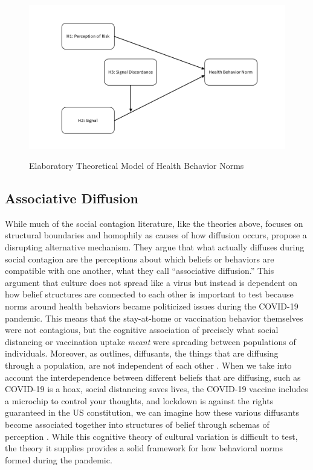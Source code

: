 \begin{figure}
{\centering \includegraphics[width=0.8\linewidth]{figs/paper3/dag}}
\caption{Elaboratory Theoretical Model of Health Behavior Norms}\label{fig:dag}
\end{figure}

\hypertarget{associative-diffusion}{%
\subsection{Associative Diffusion}\label{associative-diffusion}}

While much of the social contagion literature, like the theories above, focuses
on structural boundaries and homophily as causes of how diffusion occurs,
\citet{goldbergSocialContagionAssociative2018} propose a
disrupting alternative mechanism. They argue that what actually diffuses during
social contagion are the perceptions about which beliefs or behaviors are
compatible with one another, what they call ``associative diffusion.'' This
argument that culture does not spread like a virus but instead is dependent on
how belief structures are connected to each other is important to test because
norms around health behaviors became politicized issues during the COVID-19
pandemic. This means that the stay-at-home or vaccination behavior themselves
were not contagious, but the cognitive association of precisely what social
distancing or vaccination uptake \emph{meant} were spreading between populations of
individuals. Moreover, as \citet{houghton20} outlines, diffusants, the things that are
diffusing through a population, are not independent of each other \citep{mason_etal07}. 
When we take into account the interdependence between different beliefs that are 
diffusing, such as COVID-19 is a hoax, social distancing saves
lives, the COVID-19 vaccine includes a microchip to control your thoughts, and lockdown
is against the rights guaranteed in the US constitution, we can imagine how
these various diffusants become associated together into structures of belief
through schemas of perception \citep{houghton20}. While this cognitive theory of
cultural variation is difficult to test, the theory it supplies provides a solid
framework for how behavioral norms formed during the pandemic.

